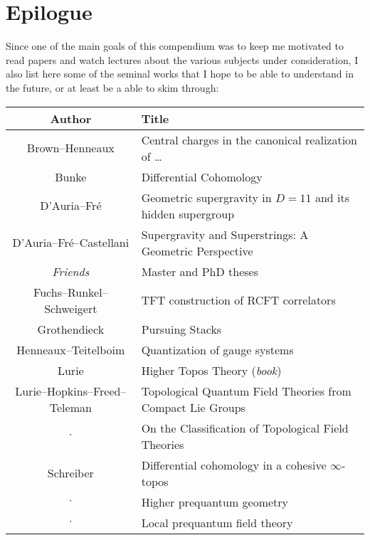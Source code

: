 \chapter{Epilogue}

   Since one of the main goals of this compendium was to keep me motivated to read papers and watch lectures about the various subjects under consideration, I also list here some of the seminal works that I hope to be able to understand in the future, or at least be a able to skim through:

   \begin{center}
       \begin{tabular}{|c|l|}
           \hline
           Author&Title\\
           \hline
           Brown--Henneaux&Central charges in the canonical realization of \ldots\\
			Bunke&Differential Cohomology\\
			D'Auria--Fr\'e&Geometric supergravity in $D=11$ and its hidden supergroup\\
			D'Auria--Fr\'e--Castellani&Supergravity and Superstrings: A Geometric Perspective\\
           \textit{Friends}&Master and PhD theses\\
           Fuchs--Runkel--Schweigert&TFT construction of RCFT correlators\\
           Grothendieck&Pursuing Stacks\\
           Henneaux--Teitelboim&Quantization of gauge systems\\
           Lurie&Higher Topos Theory (\textit{book})\\
           Lurie--Hopkins--Freed--Teleman&Topological Quantum Field Theories from Compact Lie Groups\\
           $\cdot$&On the Classification of Topological Field Theories\\
           Schreiber&Differential cohomology in a cohesive $\infty$-topos\\
           $\cdot$&Higher prequantum geometry\\
           $\cdot$&Local prequantum field theory\\
           \hline
       \end{tabular}
   \end{center}